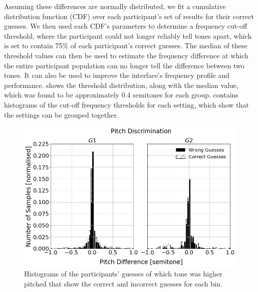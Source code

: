 \documentclass[]{interact}
\begin{document}
Assuming these differences are normally distributed, we fit a cumulative distribution function (CDF) over each participant's set of results for their correct guesses.
We then used each CDF's parameters to determine a frequency cut-off threshold, where the participant could not longer reliably tell tones apart, which is set to contain 75\% of each participant's correct guesses.
The median of these threshold values can then be used to estimate the frequency difference at which the entire participant population can no longer tell the difference between two tones. 
It can also be used to improve the interface's frequency profile and performance. 
 shows the threshold distribution, along with the median value, which was found to be approximately 0.4 semitones for each group. 
 contains histograms of the cut-off frequency thresholds for each setting, which show that the settings can be grouped together.

\begin{figure}
  \centering
  \includegraphics[width=1.0\textwidth]{figures/pitch_discrimination.png}
  \caption{Histograms of the participants' guesses of which tone was higher pitched that show the correct and incorrect guesses for each bin. }\label{fig:pitch-discrimination}
\end{figure}
\end{document}
